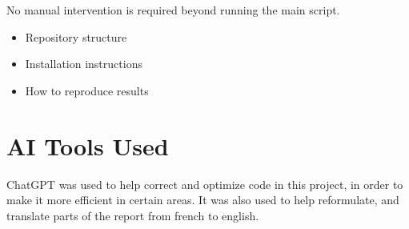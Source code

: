 \documentclass[11pt,a4paper]{article}
\begin{document}
No manual intervention is required beyond running the main script.



\noindent

\begin{itemize}
    \item Repository structure
    \item Installation instructions
    \item How to reproduce results
\end{itemize}

\section{AI Tools Used}
ChatGPT was used to help correct and optimize code in this project, in order to make it more efficient in certain areas. It was also used to help reformulate, and translate parts of the report from french to english.
\end{document}
